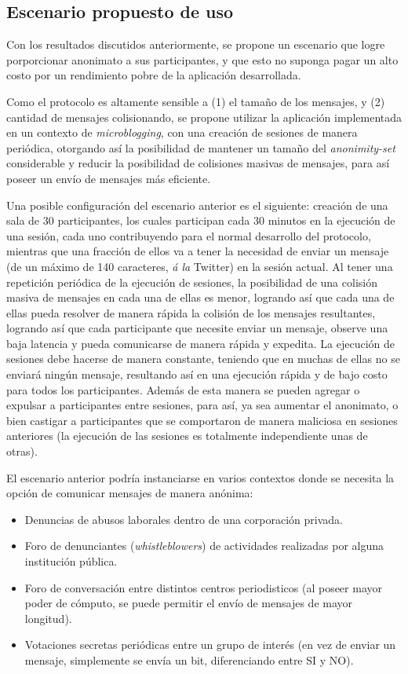 \subsection{Escenario propuesto de uso}

Con los resultados discutidos anteriormente, se propone un escenario que logre 
porporcionar anonimato a sus participantes, y que esto no suponga pagar un alto 
costo por un rendimiento pobre de la aplicación desarrollada.

Como el protocolo es altamente sensible a (1) el tamaño de los mensajes, y (2) cantidad 
de mensajes colisionando, se propone utilizar la aplicación implementada en un contexto 
de \emph{microblogging}, con una creación de sesiones de manera periódica, otorgando 
así la posibilidad de mantener un tamaño del \emph{anonimity-set} considerable y reducir 
la posibilidad de colisiones masivas de mensajes, para así poseer un envío de mensajes 
más eficiente.

Una posible configuración del escenario anterior es el siguiente: creación de una sala 
de 30 participantes, los cuales participan cada 30 minutos en la ejecución de una sesión, 
cada uno contribuyendo para el normal desarrollo del protocolo, mientras que una fracción 
de ellos va a tener la necesidad de enviar un mensaje (de un máximo de 140 caracteres, 
\emph{á la} Twitter) en la sesión actual. Al tener una repetición periódica de la ejecución 
de sesiones, la posibilidad de una colisión masiva de mensajes en cada una de ellas es menor, 
logrando así que cada una de ellas pueda resolver de manera rápida la colisión de los mensajes 
resultantes, logrando así que cada participante que necesite enviar un mensaje, observe una 
baja latencia y pueda comunicarse de manera rápida y expedita. La ejecución de sesiones 
debe hacerse de manera constante, teniendo que en muchas de ellas no se enviará ningún mensaje, 
resultando así en una ejecución rápida y de bajo costo para todos los participantes. Además de esta 
manera se pueden agregar o expulsar a participantes entre sesiones, para así, ya sea aumentar 
el anonimato, o bien castigar a participantes que se comportaron de manera maliciosa en sesiones 
anteriores (la ejecución de las sesiones es totalmente independiente unas de otras).

El escenario anterior podría instanciarse en varios contextos donde se necesita la opción 
de comunicar mensajes de manera anónima:
\begin{itemize}
	\item Denuncias de abusos laborales dentro de una corporación privada.
	\item Foro de denunciantes (\emph{whistleblowers}) de actividades 
	realizadas por alguna institución pública.
	\item Foro de conversación entre distintos centros periodisticos (al poseer mayor 
	poder de cómputo, se puede permitir el envío de mensajes de mayor longitud).
	\item Votaciones secretas periódicas entre un grupo de interés (en vez de enviar un mensaje, 
	simplemente se envía un bit, diferenciando entre SI y NO).
\end{itemize} 